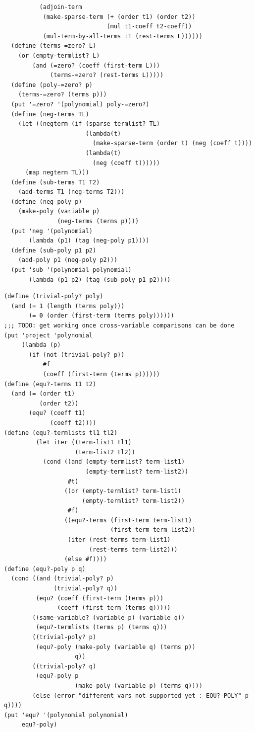 \documentclass[final,fleqn,titlepage,twoside]{article}
\begin{document}
\begin{verbatim}
          (adjoin-term
           (make-sparse-term (+ (order t1) (order t2))
                             (mul t1-coeff t2-coeff))
           (mul-term-by-all-terms t1 (rest-terms L))))))
  (define (terms-=zero? L)
    (or (empty-termlist? L)
        (and (=zero? (coeff (first-term L)))
             (terms-=zero? (rest-terms L)))))
  (define (poly-=zero? p)
    (terms-=zero? (terms p)))
  (put '=zero? '(polynomial) poly-=zero?)
  (define (neg-terms TL)
    (let ((negterm (if (sparse-termlist? TL)
                       (lambda(t)
                         (make-sparse-term (order t) (neg (coeff t))))
                       (lambda(t)
                         (neg (coeff t))))))
      (map negterm TL)))
  (define (sub-terms T1 T2)
    (add-terms T1 (neg-terms T2)))
  (define (neg-poly p)
    (make-poly (variable p)
               (neg-terms (terms p))))
  (put 'neg '(polynomial)
       (lambda (p1) (tag (neg-poly p1))))
  (define (sub-poly p1 p2)
    (add-poly p1 (neg-poly p2)))
  (put 'sub '(polynomial polynomial)
       (lambda (p1 p2) (tag (sub-poly p1 p2))))
\end{verbatim}
\begin{verbatim}
(define (trivial-poly? poly)
  (and (= 1 (length (terms poly)))
       (= 0 (order (first-term (terms poly))))))
;;; TODO: get working once cross-variable comparisons can be done
(put 'project 'polynomial
     (lambda (p)
       (if (not (trivial-poly? p))
           #f
           (coeff (first-term (terms p))))))
(define (equ?-terms t1 t2)
  (and (= (order t1)
          (order t2))
       (equ? (coeff t1)
             (coeff t2))))
(define (equ?-termlists tl1 tl2)
         (let iter ((term-list1 tl1)
                    (term-list2 tl2))
           (cond ((and (empty-termlist? term-list1)
                       (empty-termlist? term-list2))
                  #t)
                 ((or (empty-termlist? term-list1)
                      (empty-termlist? term-list2))
                  #f)
                 ((equ?-terms (first-term term-list1)
                              (first-term term-list2))
                  (iter (rest-terms term-list1)
                        (rest-terms term-list2)))
                 (else #f))))
(define (equ?-poly p q)
  (cond ((and (trivial-poly? p)
              (trivial-poly? q))
         (equ? (coeff (first-term (terms p)))
               (coeff (first-term (terms q)))))
        ((same-variable? (variable p) (variable q))
         (equ?-termlists (terms p) (terms q)))
        ((trivial-poly? p)
         (equ?-poly (make-poly (variable q) (terms p))
                    q))
        ((trivial-poly? q)
         (equ?-poly p
                    (make-poly (variable p) (terms q))))
        (else (error "different vars not supported yet : EQU?-POLY" p q))))
(put 'equ? '(polynomial polynomial)
     equ?-poly)
\end{verbatim}
\end{document}
